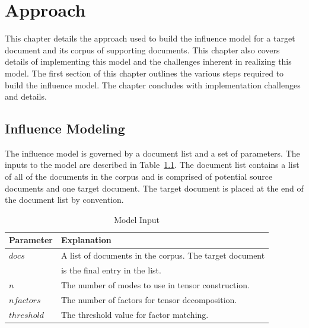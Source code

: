 \documentclass[../ut-dissertation.tex]{subfiles}
\begin{document}


\chapter{Approach}
This chapter details the approach used to build the influence model
for a target document and its corpus of supporting documents.  This
chapter also covers details of implementing this model and the
challenges inherent in realizing this model.  The first section of
this chapter outlines the various steps required to build the
influence model.  The chapter concludes with implementation challenges
and details.


\section{Influence Modeling}
The influence model is governed by a document list and a set of
parameters.  The inputs to the model are described in
Table~\ref{table:modelInput}.  The document list contains a list of all
of the documents in the corpus and is comprised of potential
source documents and one target document.  The target document is
placed at the end of the document list by convention.
\begin{table}[p]
  \centering
  \caption{Model Input}
  \label{table:modelInput}
  \begin{tabular}{ll}
    \hline
    Parameter & Explanation\\
    \hline
    $docs$ & A list of documents in the corpus.  The target document\\
           & is the final entry in the list. \\
    $n$ & The number of modes to use in tensor construction. \\
    $nfactors$ & The number of factors for tensor decomposition.\\
    $threshold$ & The threshold value for factor matching.\\
    \hline
  \end{tabular}\\
\end{table}
\end{document}
